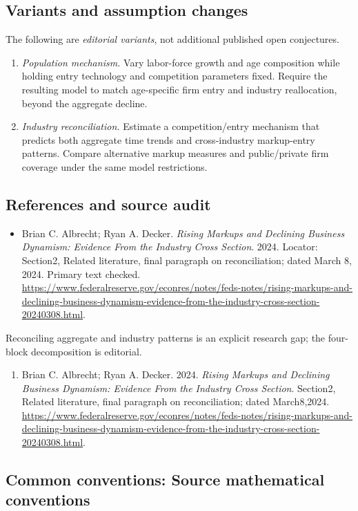 \documentclass[11pt,a4paper]{article}
\begin{document}
\subsection*{Variants and assumption changes}
The following are \emph{editorial variants}, not additional published open conjectures.
\begin{enumerate}
\item \emph{Population mechanism.} Vary labor-force growth and age composition while holding entry technology and competition parameters fixed. Require the resulting model to match age-specific firm entry and industry reallocation, beyond the aggregate decline.
\item \emph{Industry reconciliation.} Estimate a competition/entry mechanism that predicts both aggregate time trends and cross-industry markup-entry patterns. Compare alternative markup measures and public/private firm coverage under the same model restrictions.
\end{enumerate}
\subsection*{References and source audit}
\begin{itemize}
\item Brian C. Albrecht; Ryan A. Decker. \emph{Rising Markups and Declining Business Dynamism: Evidence From the Industry Cross Section}. 2024. Locator: Section2, Related literature, final paragraph on reconciliation; dated March 8, 2024. Primary text checked. \url{https://www.federalreserve.gov/econres/notes/feds-notes/rising-markups-and-declining-business-dynamism-evidence-from-the-industry-cross-section-20240308.html}.
\end{itemize}
Reconciling aggregate and industry patterns is an explicit research gap; the four-block decomposition is editorial.
\begin{enumerate}\raggedright
\item\hypertarget{definitions:source:30007546:1}{} Brian C. Albrecht; Ryan A. Decker. 2024. \emph{Rising Markups and Declining Business Dynamism: Evidence From the Industry Cross Section}. Section2, Related literature, final paragraph on reconciliation; dated March8,2024.
\url{https://www.federalreserve.gov/econres/notes/feds-notes/rising-markups-and-declining-business-dynamism-evidence-from-the-industry-cross-section-20240308.html}.
\end{enumerate}

\subsection*{Common conventions: Source mathematical conventions}
\end{document}
